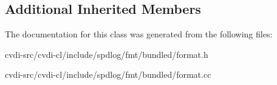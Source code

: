 \subsection*{Additional Inherited Members}


The documentation for this class was generated from the following files\+:\begin{DoxyCompactItemize}
\item 
cvdi-\/src/cvdi-\/cl/include/spdlog/fmt/bundled/format.\+h\item 
cvdi-\/src/cvdi-\/cl/include/spdlog/fmt/bundled/format.\+cc\end{DoxyCompactItemize}
